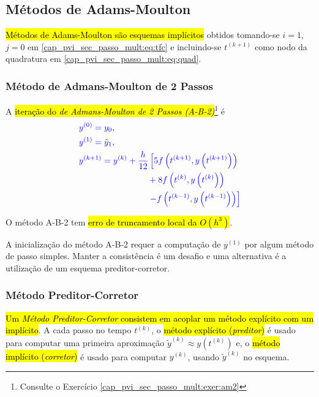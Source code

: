 \subsection{Métodos de Adams-Moulton}

\hl{Métodos de Adams-Moulton são esquemas implícitos} obtidos tomando-se $i=1$, $j=0$ em \eqref{cap_pvi_sec_passo_mult:eq:tfc} e incluindo-se $t^{(k+1)}$ como nodo da quadratura em \eqref{cap_pvi_sec_passo_mult:eq:quad}.

\subsubsection{Método de Admans-Moulton de 2 Passos}

A \hl{iteração do \emph{de Admans-Moulton de 2 Passos (A-B-2)}}\footnote{Consulte o Exercício \ref{cap_pvi_sec_passo_mult:exer:am2}} é
\begin{equation}\color{blue}\label{cap_pvi_sec_passo_mult:eq:iter_am2}
  \begin{aligned}
    &y^{(0)} = y_0,\\
    &y^{(1)} = \tilde{y}_1,\\
    &y^{(k+1)} = y^{(k)} + \frac{h}{12}\left[5f\left(t^{(k+1)}, y\left(t^{(k+1)}\right)\right)\right.\\
    &\qquad\qquad\qquad\qquad + 8f\left(t^{(k)}, y\left(t^{(k)}\right)\right) \\
    &\qquad\qquad\qquad\qquad\left.  - f\left(t^{(k-1)}, y\left(t^{(k-1)}\right)\right)\right]
  \end{aligned}
\end{equation}

\begin{obs}
  O método A-B-2 tem \hl{erro de truncamento local da $O(h^3)$}.
\end{obs}


A inicialização do método A-B-2 requer a computação de $y^{(1)}$ por algum método de passo simples. Manter a consistência é um desafio e uma alternativa é a utilização de um esquema preditor-corretor.

\subsubsection{Método Preditor-Corretor}

\hl{Um \emph{Método Preditor-Corretor} consistem em acoplar um método explícito com um implícito}. A cada passo no tempo $t^{(k)}$, o \hl{método explícito (\emph{preditor})} é usado para computar uma primeira aproximação $\tilde{y}^{(k)}\approx y\left(t^{(k)}\right)$ e, o \hl{método implícito (\emph{corretor})} é usado para computar $y^{(k)}$, usando $\tilde{y}^{(k)}$ no esquema.


